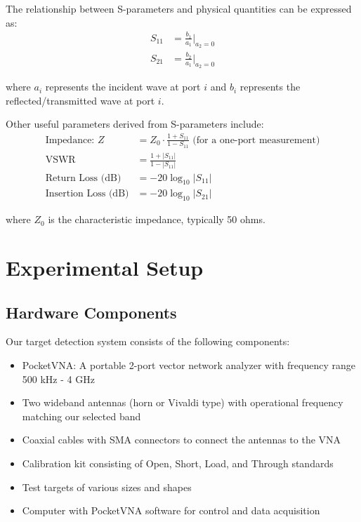 \documentclass[11pt,a4paper]{article}
\begin{document}
The relationship between S-parameters and physical quantities can be expressed as:
\begin{align}
    S_{11} &= \frac{b_1}{a_1}|_{a_2=0} \\
    S_{21} &= \frac{b_2}{a_1}|_{a_2=0}
\end{align}

where $a_i$ represents the incident wave at port $i$ and $b_i$ represents the reflected/transmitted wave at port $i$.

Other useful parameters derived from S-parameters include:
\begin{align}
    \text{Impedance: } Z &= Z_0 \cdot \frac{1+S_{11}}{1-S_{11}} \text{ (for a one-port measurement)} \\
    \text{VSWR} &= \frac{1+|S_{11}|}{1-|S_{11}|} \\
    \text{Return Loss (dB)} &= -20\log_{10}|S_{11}| \\
    \text{Insertion Loss (dB)} &= -20\log_{10}|S_{21}|
\end{align}

where $Z_0$ is the characteristic impedance, typically 50 ohms.

\section{Experimental Setup}

\subsection{Hardware Components}

Our target detection system consists of the following components:

\begin{itemize}
    \item PocketVNA: A portable 2-port vector network analyzer with frequency range 500 kHz - 4 GHz
    \item Two wideband antennas (horn or Vivaldi type) with operational frequency matching our selected band
    \item Coaxial cables with SMA connectors to connect the antennas to the VNA
    \item Calibration kit consisting of Open, Short, Load, and Through standards
    \item Test targets of various sizes and shapes
    \item Computer with PocketVNA software for control and data acquisition
\end{itemize}
\end{document}
